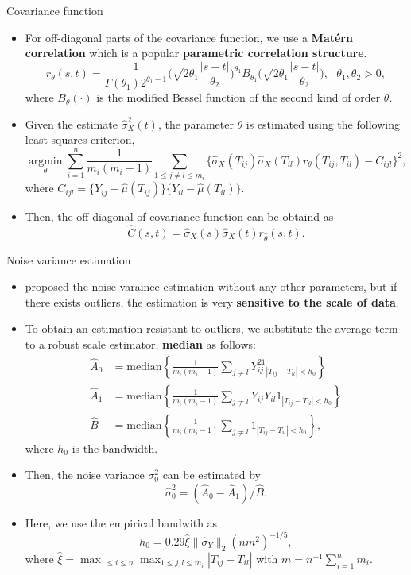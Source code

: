 \documentclass[9pt]{beamer}
\begin{document}
\begin{frame}[allowframebreaks]{Covariance function}
\begin{itemize}
	
		\pagebreak
		\item{
			For off-diagonal parts of the covariance function, we use a \textbf{Mat\'{e}rn correlation} which is a popular \textbf{parametric correlation structure}.
			$$
			r_{\theta}(s,t) = \frac{1}{ \Gamma(\theta_1) 2^{\theta_1 -1} }  \Big( \sqrt{2 \theta_1} \frac{ | s-t | }{\theta_2} \Big)^{\theta_1} B_{\theta_1} \Big( \sqrt{2 \theta_1} \frac{ | s-t | }{\theta_2} \Big) ,~~~ \theta_1 , \theta_2 >0, 
			$$
			where $B_{\theta}(\cdot)$ is the modified Bessel function of the second kind of order $\theta$.
		}
		\item{
			Given the estimate $\hat\sigma^2_X(t)$, the parameter $\theta$ is estimated using the following least squares criterion,
			$$  \underset{\theta}{\operatorname{\arg\min}} \sum_{i=1}^n \frac{1}{ m_i (m_i -1) }\sum_{ 1 \leq j \neq l \leq m_i} \{ \hat \sigma_X (T_{ij} ) \hat \sigma_X (T_{il} )
			r_{\theta}(T_{ij} , T_{il}) - C_{ijl} \}^2,$$
			where $C_{ijl} = \{ Y_{ij} - \hat \mu (T_{ij} ) \} \{ Y_{il} - \hat \mu (T_{il} ) \} $.
		}
		\item{
			Then, the off-diagonal of covariance function can be obtaind as
			$$
			\hat C(s,t) = \hat\sigma_X(s) \hat\sigma_X(t) r_{\hat\theta}(s,t).
			$$
		}
	\end{itemize}
\end{frame}


\begin{frame}[allowframebreaks]{Noise variance estimation}
	\begin{itemize}
		\item{
			\cite{Lin2020} proposed the noise varaince estimation without any other parameters, but if there exists outliers, the estimation is very \textbf{sensitive to the scale of data}.
		}
		\item{
			To obtain an estimation resistant to outliers, we substitute the average term to a robust scale estimator, \textbf{median} as follows:
			\begin{align*}
				\hat{A}_0 &= \text{median} \left\{ \frac{1}{m_i(m_i-1)} \sum_{j \ne l} Y_{ij}^21_{|T_{ij}-T_{il}|<h_0} \right\} \\
				\hat{A}_1 &= \text{median} \left\{ \frac{1}{m_i(m_i-1)} \sum_{j \ne l} Y_{ij} Y_{il} 1_{|T_{ij}-T_{il}|<h_0} \right\} \\
				\hat{B}   &= \text{median} \left\{ \frac{1}{m_i(m_i-1)} \sum_{j \ne l} 1_{|T_{ij}-T_{il}|<h_0} \right\},
			\end{align*}
			where $h_0$ is the bandwidth.
		}
		
		\pagebreak
		\item{
			Then, the noise variance $\sigma_0^2$ can be estimated by
			$$
			\hat\sigma^2_0 = ( \hat{A}_0 - \hat{A}_1 ) / \hat{B}.
			$$
		}
		\item{
			Here, we use the empirical bandwith as 
			$$
			h_0 = 0.29  \hat \xi \lVert \hat\sigma_Y \rVert_2 (n m^2)^{-1/5},
			$$
			where $\hat \xi = \max_{1 \leq i \leq n} \max_{1 \leq j,l \leq m_i} | T_{ij} - T_{il}|$ with $m= n^{-1} \sum_{i=1}^n m_i$.
		}
	\end{itemize}
\end{frame}
\end{document}
